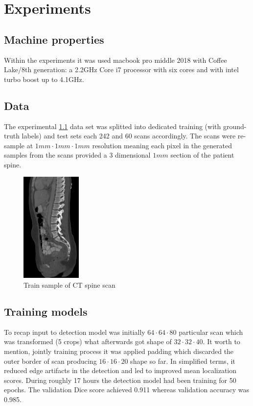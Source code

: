 \chapter{Experiments}
\label{ch:experiments}


\section{Machine properties}
Within the experiments it was used macbook pro middle 2018 with Coffee Lake/8th generation: a 2.2GHz Core i7 processor with six cores and with intel turbo boost up to 4.1GHz.

\section{Data}
The experimental \ref{fig:ct_spine} data set was splitted into dedicated training (with ground-truth labels) and test sets each 242 and 60 scans accordingly. The scans were re-sample at $1mm \cdot 1mm \cdot 1mm$ resolution meaning each pixel in the generated samples from the scans provided a 3 dimensional $1mm$ section of the patient spine.
\begin{figure}[h]
    \centering \includegraphics[width=3cm]{images/ct-spine.jpg}
    \caption {Train sample of CT spine scan}
    \label{fig:ct_spine}
\end{figure}


\section{Training models}
To recap input to detection model was initially $64 \cdot 64 \cdot 80$ particular scan which was transformed (5 crops) what afterwards got shape of $32 \cdot 32 \cdot 40$. It worth to mention, jointly training process it was applied padding which discarded the outer border of scan producing $16 \cdot 16 \cdot 20$ shape so far. In simplified terms, it reduced edge artifacts in the detection and led to improved mean localization scores. During roughly 17 hours the detection model had been training for 50 epochs. The validation Dice score achieved 0.911 whereas validation accuracy was 0.985. 

